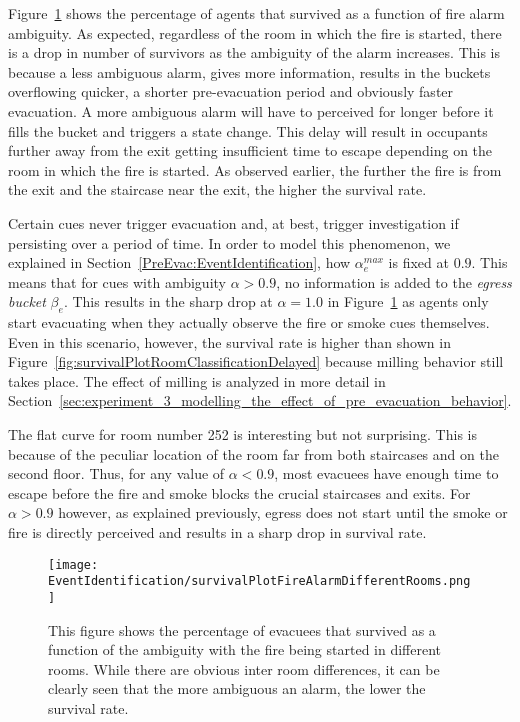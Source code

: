 Figure~\ref{fig:SurvivalPlotDifferentRooms} shows the percentage of agents that survived as a function of fire alarm ambiguity. As expected, regardless of the room in which the fire is started, there is a drop in number of survivors as the ambiguity of the alarm increases. This is because a less ambiguous alarm, gives more information, results in the buckets overflowing quicker, a shorter pre-evacuation period and obviously faster evacuation. A more ambiguous alarm will have to perceived for longer before it fills the bucket and triggers a state change. This delay will result in occupants further away from the exit getting insufficient time to escape depending on the room in which the fire is started. As observed earlier, the further the fire is from the exit and the staircase near the exit, the higher the survival rate.

Certain cues never trigger evacuation and, at best, trigger investigation if persisting over a period of time. In order to model this phenomenon, we explained in Section~\ref{PreEvac:EventIdentification}, how $\alpha^{max}_{e}$ is fixed at $0.9$. This means that for cues with ambiguity $\alpha > 0.9$, no information is added to the \emph{egress bucket} $\beta_{e}$.
This results in the sharp drop at $\alpha = 1.0$ in Figure~\ref{fig:SurvivalPlotDifferentRooms} as agents only start evacuating when they actually observe the fire or smoke cues themselves. Even in this scenario, however, the survival rate is higher than shown in Figure~\ref{fig:survivalPlotRoomClassificationDelayed} because milling behavior still takes place. The effect of milling is analyzed in more detail in Section~\ref{sec:experiment_3_modelling_the_effect_of_pre_evacuation_behavior}.

The flat curve for room number 252 is interesting but not surprising. This is because of the peculiar location of the room far from both staircases and on the second floor. Thus, for any value of $\alpha < 0.9$, most evacuees have enough time to escape before the fire and smoke blocks the crucial staircases and exits. For $\alpha > 0.9$ however, as explained previously, egress does not start until the smoke or fire is directly perceived and results in a sharp drop in survival rate.

\begin{figure}[!t]
	\centering
		\texttt{[image: EventIdentification/survivalPlotFireAlarmDifferentRooms.png]}

	\caption[Experiment 1: The effect of fire alarm ambiguity]{This figure shows the percentage of evacuees that survived as a function of the ambiguity with the fire being started in different rooms. While there are obvious inter room differences, it can be clearly seen that the more ambiguous an alarm, the lower the survival rate.}
	\label{fig:SurvivalPlotDifferentRooms}
\end{figure}

